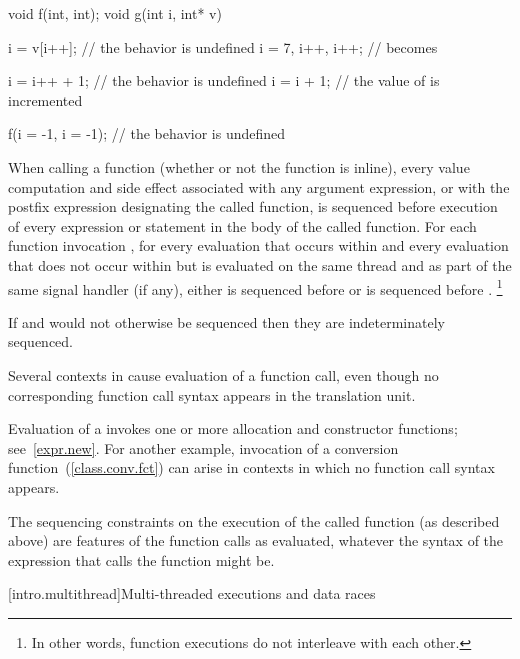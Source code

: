 \begin{example}

\begin{codeblock}
void f(int, int);
void g(int i, int* v) {
  i = v[i++];         // the behavior is undefined
  i = 7, i++, i++;    //  becomes 

  i = i++ + 1;        // the behavior is undefined
  i = i + 1;          // the value of  is incremented

  f(i = -1, i = -1);  // the behavior is undefined
}
\end{codeblock}
\end{example}

\pnum
When calling a function (whether or not the function is inline), every
%
value computation and
%
side effect associated with any argument
expression, or with the postfix expression designating the called
function, is sequenced before execution of every expression or statement
in the body of the called function.
For each function invocation ,
for every evaluation  that occurs within  and
every evaluation  that does not occur within  but
is evaluated on the same thread and as part of the same signal handler (if any),
either  is sequenced before  or
 is sequenced before .
\footnote{In other words, function executions do not interleave with
each other.}
\begin{note}
If  and  would not otherwise be sequenced then they are
indeterminately sequenced.
\end{note}
Several contexts in \Cpp  cause evaluation of a function call, even
though no corresponding function call syntax appears in the translation
unit.
\begin{example}
Evaluation of a  invokes one or more allocation
and constructor functions; see~\ref{expr.new}. For another example,
invocation of a conversion function~(\ref{class.conv.fct}) can arise in
contexts in which no function call syntax appears.
\end{example}
The sequencing constraints on the execution of the called function (as
described above) are features of the function calls as evaluated,
whatever the syntax of the expression that calls the function might be.%
%

[intro.multithread]{Multi-threaded executions and data races}

